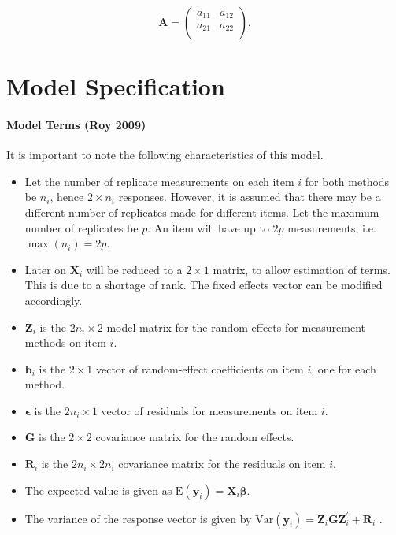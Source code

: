 \documentclass[12pt, a4paper]{report}
\theoremstyle{plain}
\theoremstyle{definition}
\theoremstyle{remark}
\begin{document}
	\[
	\boldsymbol{A} = \left( \begin{array}{cc}
	a_{11} & a_{12}  \\
	a_{21} & a_{22}  \\
	\end{array}\right).
	\]
	
	

	
	
\chapter{Model Specification}
\subsubsection{Model Terms (Roy 2009)}
It is important to note the following characteristics of this model.
\begin{itemize}
	\item Let the number of replicate measurements on each item $i$ for both methods be $n_i$, hence $2 \times n_i$ responses. However, it is assumed that there may be a different number of replicates made for different items. Let the maximum number of replicates be $p$. An item will have up to $2p$ measurements, i.e. $\max(n_{i}) = 2p$.
	
	
	\item Later on $\boldsymbol{X}_i$ will be reduced to a $2 \times 1$ matrix, to allow estimation of terms. This is due to a shortage of rank. The fixed effects vector can be modified accordingly.
	\item $\boldsymbol{Z}_i$ is the $2n_i \times  2$ model matrix for the random effects for measurement methods on item $i$.
	\item $\boldsymbol{b}_i$ is the $2 \times  1$ vector of random-effect coefficients on item $i$, one for each method.
	\item $\boldsymbol{\epsilon}$  is the $2n_i \times  1$ vector of residuals for measurements on item $i$.
	\item $\boldsymbol{G}$ is the $2 \times  2$ covariance matrix for the random effects.
	\item $\boldsymbol{R}_i$ is the $2n_i \times  2n_i$ covariance matrix for the residuals on item $i$.
	\item The expected value is given as $\mbox{E}(\boldsymbol{y}_i) = \boldsymbol{X}_i\boldsymbol{\beta}.$ \citep{hamlett}
	\item The variance of the response vector is given by $\mbox{Var}(\boldsymbol{y}_i)  = \boldsymbol{Z}_i \boldsymbol{G} \boldsymbol{Z}_i^{\prime} + \boldsymbol{R}_i$ \citep{hamlett}.
\end{itemize}
\end{document}
